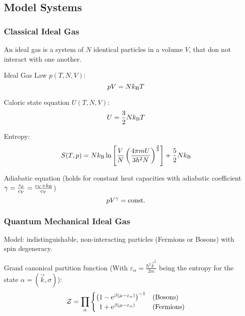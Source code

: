 	\subsection{Model Systems}
		\subsubsection{Classical Ideal Gas}
			\noindent
			An ideal gas is a system of $N$ identical particles in a volume $V$, that don not interact with one another.\vsp

			\noindent
			Ideal Gas Law $p(T, N, V)$:
			\begin{equation}
				pV = N k_{\text{B}} T
			\end{equation}

			\noindent
			Caloric state equation $U(T, N, V)$:
			\begin{equation}
				U = \frac{3}{2} N k_{\text{B}} T
			\end{equation}

			\noindent
			Entropy:
			\begin{equation}
				S(T,p) = N k_{\text{B}} \ln{\left[ \frac{V}{N}\left( \frac{4\pi m	U}{3 h^2 N} \right)^{\frac{3}{2}} \right]} + \frac{5}{2} N k_{\text{B}}
			\end{equation}

			\noindent
			Adiabatic equation (holds for constant heat capacities with adiabatic coefficient $\gamma = \frac{c_p}{c_V} = \frac{c_V + k_{\text{B}}}{c_V}$)
			\begin{equation}
				p V^\gamma = \mathrm{const.}
			\end{equation}

		\subsubsection{Quantum Mechanical Ideal Gas}
			\noindent
			Model: indistinguishable, non-interacting particles (Fermions or Bosons) with spin degeneracy. \vsp

			\noindent
			Grand canonical partition function (With $\varepsilon_\alpha = \frac{\hbar^2 \vec{k}^2}{2m}$ being the entropy for the state $\alpha=(\vec{k},\sigma)$):
			\begin{equation}
				\mathcal{Z} = \prod_{\alpha}
				\begin{cases}
					\left( 1-\mathrm{e}^{\beta(\mu-\varepsilon_\alpha)}\right)^{-1} & \text{(Bosons)} \\
					\phantom{\big(} 1+\mathrm{e}^{\beta(\mu-\varepsilon_\alpha)} & \text{(Fermions)}
				\end{cases}
			\end{equation}

